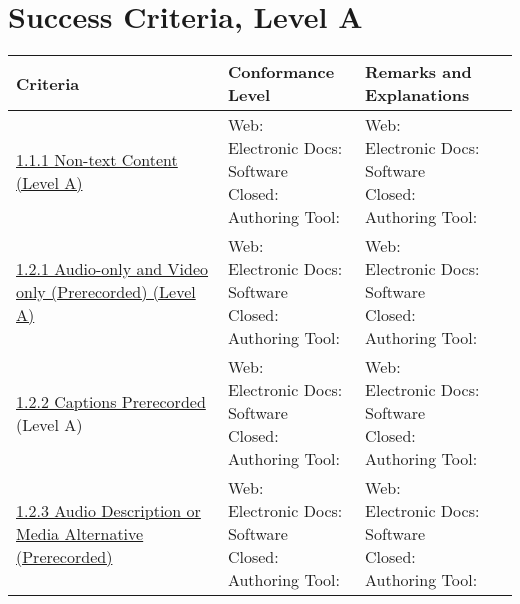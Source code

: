 \documentclass[a4paper]{report}
\begin{document}
\section{Success Criteria, Level A}
\begin{longtable}{|l|l|l|}
    \hline
	Criteria & Conformance Level & Remarks and Explanations \\
	\hline
	\href{https://www.w3.org/TR/WCAG20/#text-equiv-all}{1.1.1 Non-text Content (Level A)} &
 	\makecell{Web: \\ Electronic Docs: \\ Software \\ Closed: \\ Authoring Tool:} & \makecell{Web: \\ Electronic Docs: \\ Software \\ Closed: \\ Authoring Tool:}\\
        \hline
        \href{https://www.w3.org/TR/WCAG20/#media-equiv-av-only-alt}{1.2.1 Audio-only and Video only (Prerecorded) (Level A)} &
        \makecell{Web: \\ Electronic Docs: \\ Software \\ Closed: \\ Authoring Tool:} & \makecell{Web: \\ Electronic Docs: \\ Software \\ Closed: \\ Authoring Tool:}\\
        \hline
        \href{https://www.w3.org/TR/WCAG20/#media-equiv-captions}{1.2.2 Captions Prerecorded} (Level A) &
        \makecell{Web: \\ Electronic Docs: \\ Software \\ Closed: \\ Authoring Tool:} & \makecell{Web: \\ Electronic Docs: \\ Software \\ Closed: \\ Authoring Tool:} \\
        \hline
        \href{http://www.w3.org/TR/WCAG20/#media-equiv-audio-desc}{1.2.3 Audio Description or Media Alternative (Prerecorded)} &
        \makecell{Web: \\ Electronic Docs: \\ Software \\ Closed: \\ Authoring Tool:} & \makecell{Web: \\ Electronic Docs: \\ Software \\ Closed: \\ Authoring Tool:}\\

\end{longtable}
\end{document}
